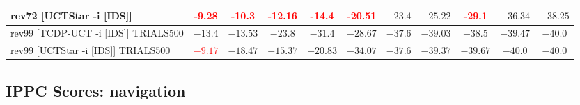 \documentclass{article}
\begin{document}
\begin{tabular}{|l|r@{$\pm$}rr@{$\pm$}rr@{$\pm$}rr@{$\pm$}rr@{$\pm$}rr@{$\pm$}rr@{$\pm$}rr@{$\pm$}rr@{$\pm$}rr@{$\pm$}r|}
\\
rev72 [UCTStar -i [IDS]]
& \multicolumn{2}{c}{\textbf{\textcolor{red}{-9.28}}}
& \multicolumn{2}{c}{\textbf{\textcolor{red}{-10.3}}}
& \multicolumn{2}{c}{\textbf{\textcolor{red}{-12.16}}}
& \multicolumn{2}{c}{\textbf{\textcolor{red}{-14.4}}}
& \multicolumn{2}{c}{\textbf{\textcolor{red}{-20.51}}}
& \multicolumn{2}{c}{$-23.4$}
& \multicolumn{2}{c}{$-25.22$}
& \multicolumn{2}{c}{\textbf{\textcolor{red}{-29.1}}}
& \multicolumn{2}{c}{$-36.34$}
& \multicolumn{2}{c|}{$-38.25$}
\\
\hline
rev99 [TCDP-UCT -i [IDS]] TRIALS500
& \multicolumn{2}{c}{$-13.4$}
& \multicolumn{2}{c}{$-13.53$}
& \multicolumn{2}{c}{$-23.8$}
& \multicolumn{2}{c}{$-31.4$}
& \multicolumn{2}{c}{$-28.67$}
& \multicolumn{2}{c}{$-37.6$}
& \multicolumn{2}{c}{$-39.03$}
& \multicolumn{2}{c}{$-38.5$}
& \multicolumn{2}{c}{$-39.47$}
& \multicolumn{2}{c|}{$-40.0$}
\\
rev99 [UCTStar -i [IDS]] TRIALS500
& \multicolumn{2}{c}{\textbf{\textcolor{red}{$-9.17$}}}
& \multicolumn{2}{c}{$-18.47$}
& \multicolumn{2}{c}{$-15.37$}
& \multicolumn{2}{c}{$-20.83$}
& \multicolumn{2}{c}{$-34.07$}
& \multicolumn{2}{c}{$-37.6$}
& \multicolumn{2}{c}{$-39.37$}
& \multicolumn{2}{c}{$-39.67$}
& \multicolumn{2}{c}{$-40.0$}
& \multicolumn{2}{c|}{$-40.0$}
\\
\hline
\end{tabular}%

\bigskip

\subsection*{IPPC Scores: navigation}
\end{document}
